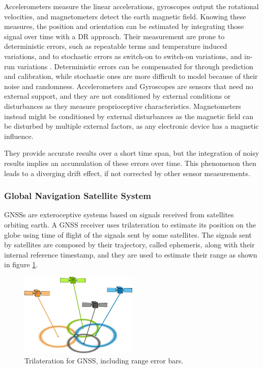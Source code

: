Accelerometers measure the linear accelerations, gyroscopes output the rotational velocities, and magnetometers detect the earth magnetic field.
Knowing these measures, the position and orientation can be estimated by integrating those signal over time with a \gls{DR} approach.
Their measurement are prone to deterministic errors, such as repeatable terms and temperature induced variations, and to stochastic errors as switch-on to switch-on variations, and in-run variations \cite{magnusson_improving_2012}. 
Deterministic errors can be compensated for through prediction and calibration, while stochastic ones are more difficult to model because of their noise and randomness.
Accelerometers and Gyroscopes are sensors that need no external support, and they are not conditioned by external conditions or disturbances as they measure proprioceptive characteristics.
Magnetometers instead might be conditioned by external disturbances as the magnetic field can be disturbed by multiple external factors, as any electronic device has a magnetic influence.

They provide accurate results over a short time span, but the integration of noisy results implies an accumulation of these errors over time. This phenomenon then leads to a diverging drift effect, if not corrected by other sensor measurements.


\subsubsection{Global Navigation Satellite System}

\noindent \glspl{GNSS} are exteroceptive systems based on signals received from satellites orbiting earth.
A \gls{GNSS} receiver uses trilateration to estimate its position on the globe using time of flight of the signals sent by some satellites.
The signals sent by satellites are composed by their trajectory, called ephemeris, along with their internal reference timestamp, and they are used to estimate their range as shown in figure \ref{fig:gps}.
\begin{figure}[!ht]
  \begin{center}
    \includegraphics[width=0.5\textwidth]{Images/2-Background/GPS.png}
  \end{center}
  \caption{Trilateration for \Gls{GNSS}, including range error bars.}
  \label{fig:gps}
\end{figure}

